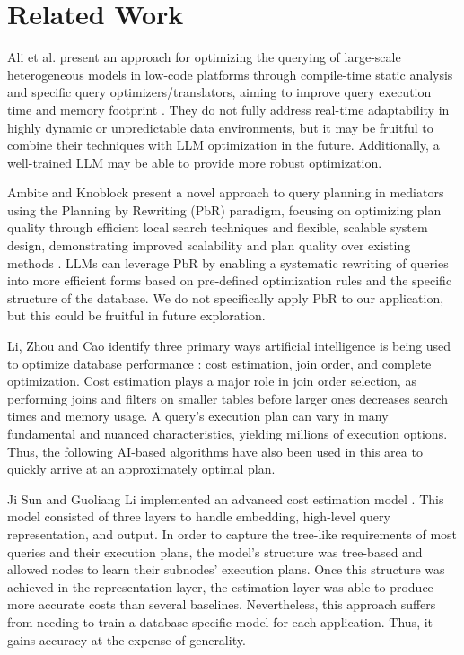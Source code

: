 \section{Related Work}

Ali et al. present an approach for optimizing the querying of large-scale heterogeneous models in low-code platforms through compile-time static analysis and specific query optimizers/translators, aiming to improve query execution time and memory footprint \cite{Ali2020EfficientlyQM}. They do not fully address real-time adaptability in highly dynamic or unpredictable data environments, but it may be fruitful to combine their techniques with LLM optimization in the future. Additionally, a well-trained LLM may be able to provide more robust optimization.

Ambite and Knoblock present a novel approach to query planning in mediators using the Planning by Rewriting (PbR) paradigm, focusing on optimizing plan quality through efficient local search techniques and flexible, scalable system design, demonstrating improved scalability and plan quality over existing methods \cite{Ambite2000FlexibleQP}. LLMs can leverage PbR by enabling a systematic rewriting of queries into more efficient forms based on pre-defined optimization rules and the specific structure of the database. We do not specifically apply PbR to our application, but this could be fruitful in future exploration.

Li, Zhou and Cao identify three primary ways artificial intelligence is being used to optimize database performance \cite{li2021}: cost estimation, join order, and complete optimization. Cost estimation plays a major role in join order selection, as performing joins and filters on smaller tables before larger ones decreases search times and memory usage. A query's execution plan can vary in many fundamental and nuanced characteristics, yielding millions of execution options. Thus, the following AI-based algorithms have also been used in this area to quickly arrive at an approximately optimal plan.

Ji Sun and Guoliang Li implemented an advanced cost estimation model \cite{sun2019}. This model consisted of three layers to handle embedding, high-level query representation, and output. In order to capture the tree-like requirements of most queries and their execution plans, the model's structure was tree-based and allowed nodes to learn their subnodes' execution plans. Once this structure was achieved in the representation-layer, the estimation layer was able to produce more accurate costs than several baselines. Nevertheless, this approach suffers from needing to train a database-specific model for each application. Thus, it gains accuracy at the expense of generality.

